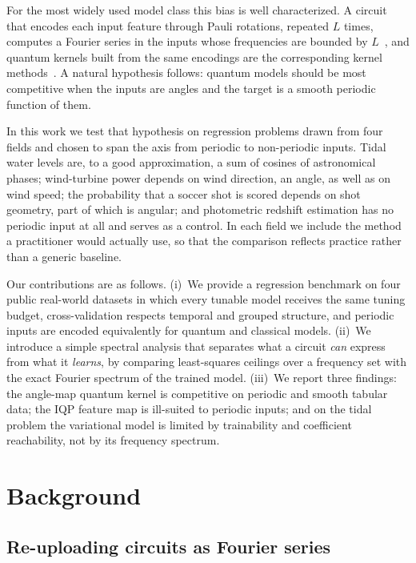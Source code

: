 \documentclass[11pt,letterpaper]{article}
\begin{document}
For the most widely used model class this bias is well characterized. A circuit that encodes
each input feature through Pauli rotations, repeated $L$ times, computes a Fourier series in
the inputs whose frequencies are bounded by $L$~\cite{schuld2021effect,perezsalinas2020reuploading},
and quantum kernels built from the same encodings are the corresponding kernel
methods~\cite{schuld2021kernel}. A natural hypothesis follows: quantum models should be most
competitive when the inputs are angles and the target is a smooth periodic function of them.

In this work we test that hypothesis on regression problems drawn from four fields and chosen
to span the axis from periodic to non-periodic inputs. Tidal water levels are, to a good
approximation, a sum of cosines of astronomical phases; wind-turbine power depends on wind
direction, an angle, as well as on wind speed; the probability that a soccer shot is scored
depends on shot geometry, part of which is angular; and photometric redshift estimation has no
periodic input at all and serves as a control. In each field we include the method a
practitioner would actually use, so that the comparison reflects practice rather than a
generic baseline.

Our contributions are as follows. (i)~We provide a regression benchmark on four public
real-world datasets in which every tunable model receives the same tuning budget,
cross-validation respects temporal and grouped structure, and periodic inputs are encoded
equivalently for quantum and classical models. (ii)~We introduce a simple spectral analysis
that separates what a circuit \emph{can} express from what it \emph{learns}, by comparing
least-squares ceilings over a frequency set with the exact Fourier spectrum of the trained
model. (iii)~We report three findings: the angle-map quantum kernel is competitive on periodic
and smooth tabular data; the IQP feature map is ill-suited to periodic inputs; and on the
tidal problem the variational model is limited by trainability and coefficient reachability,
not by its frequency spectrum.

\section{Background}

\subsection{Re-uploading circuits as Fourier series}
\end{document}
